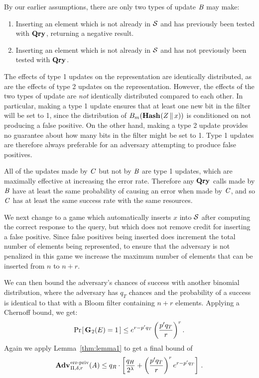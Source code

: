 By our earlier assumptions, there are only two types of update $\mathit{B}$ may make:
%
\begin{enumerate}[leftmargin=.1in]
  \item Inserting an element which is not already in $\mathcal{S}$ and has previously been tested with $\textup{\textbf{Qry}}\hspace{0.5pt}$, returning a negative result.
  \item Inserting an element which is not already in $\mathcal{S}$ and has not previously been tested with $\textup{\textbf{Qry}}\hspace{0.5pt}$.
\end{enumerate}
The effects of type 1 updates
on the representation are identically distributed, as are the effects of type 2 updates on
the representation. However, the effects of the
two types of update are \emph{not} identically distributed compared to each
other. In particular, making a type 1 update ensures that at least one new bit
in the filter will be set to 1, since the distribution of
${B}_m(\textup{\textbf{Hash}}\hspace{0.5pt}(Z \, \| \, x))$ is conditioned on not producing a false
positive. On the other hand, making a type 2 update provides no guarantee about
how many bits in the filter might be set to 1. Type 1 updates are therefore
always preferable for an adversary attempting to produce false positives. %

All of the updates made by $\mathit{C}$ but not
by $\mathit{B}$ are type 1 updates, which are maximally effective at increasing the
error rate. Therefore any $\textup{\textbf{Qry}}\hspace{0.5pt}$ calls made by $\mathit{B}$ have at least the same
probability of causing an error when made by $\mathit{C}$, and so
$\mathit{C}$ has at least the same success rate with the same resources.

We next change to a game which
automatically inserts $x$ into $\mathcal{S}$ after computing the correct response to the
query, but which does not remove credit for inserting a false positive. Since false
positives being inserted does increment the total number of elements being
represented, to ensure that the adversary is not penalized in this game we
increase the maximum number of elements that can be inserted from $n$ to $n+r$.

We can then bound the adversary's chances of success with another binomial
distribution, where the adversary has $q_T$ chances and the probability of a
success is identical to that with a Bloom filter containing $n+r$ elements.
Applying a Chernoff bound, we get:
\begin{equation}
   \Pr\hspace{-1pt}\left[\,\textup{\textbf{G}}\hspace{0.5pt}_2(E)=1\,\right] \le
     e^{r-p'q_T}\left(\frac{p'q_T}{r}\right)^r.
\end{equation}
%
Again we apply Lemma~\ref{thm:lemma1} to get a final bound of
\begin{equation}
  \Adv{\erreps}_{\Pi,\delta,r}(\advA) \leq
    q_R \cdot \left[
      \frac{q_H}{2^\lambda} +
      \left(\frac{p'q_T}{r}\right)^re^{r-p'q_T}
    \right] \,.
\end{equation}

